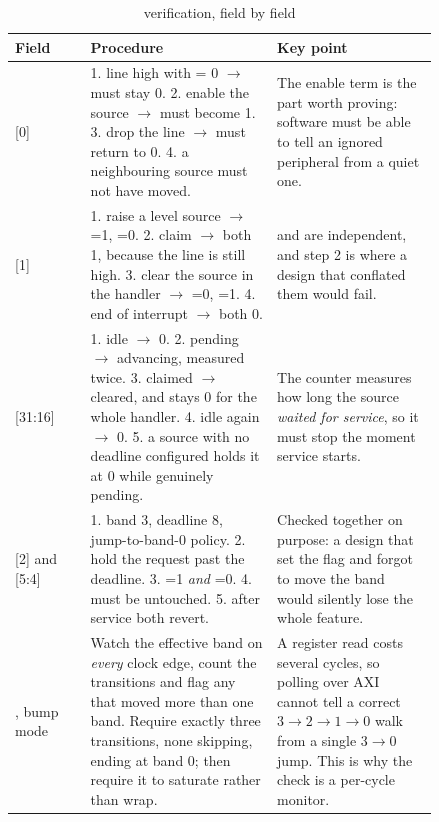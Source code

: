 \begin{table}[H]
\centering
\caption{ verification, field by field}
\label{tab:vpstatus}
\begin{tabular}{@{}L{0.15\linewidth}L{0.37\linewidth}L{0.32\linewidth}@{}}
\toprule
\textbf{Field} & \textbf{Procedure} & \textbf{Key point} \\
\midrule
{} [0] &
  1. line high with  = 0 $\rightarrow$ must stay 0.
  2. enable the source $\rightarrow$ must become 1.
  3. drop the line $\rightarrow$ must return to 0.
  4. a neighbouring source must not have moved. &
  The enable term is the part worth proving: software must be able to tell an
  ignored peripheral from a quiet one. \\
\midrule
{} [1] &
  1. raise a level source $\rightarrow$ =1, =0.
  2. claim $\rightarrow$ both 1, because the line is still high.
  3. clear the source in the handler $\rightarrow$ =0,
     =1.
  4. end of interrupt $\rightarrow$ both 0. &
   and  are independent, and step 2 is where a design that
  conflated them would fail. \\
\midrule
{} [31:16] &
  1. idle $\rightarrow$ 0. 2. pending $\rightarrow$ advancing, measured twice.
  3. claimed $\rightarrow$ cleared, and stays 0 for the whole handler.
  4. idle again $\rightarrow$ 0. 5. a source with no deadline configured holds
  it at 0 while genuinely pending. &
  The counter measures how long the source \emph{waited for service}, so it must
  stop the moment service starts. \\
\midrule
{} [2] and  [5:4] &
  1. band 3, deadline 8, jump-to-band-0 policy. 2. hold the request past the
  deadline. 3. =1 \emph{and} =0. 4. 
  must be untouched. 5. after service both revert. &
  Checked together on purpose: a design that set the flag and forgot to move the
  band would silently lose the whole feature. \\
\midrule
{}, bump mode &
  Watch the effective band on \emph{every} clock edge, count the transitions
  and flag any that moved more than one band. Require exactly three
  transitions, none skipping, ending at band 0; then require it to saturate
  rather than wrap. &
  A register read costs several cycles, so polling over AXI cannot tell a
  correct $3\rightarrow2\rightarrow1\rightarrow0$ walk from a single
  $3\rightarrow0$ jump. This is why the check is a per-cycle monitor. \\

\end{tabular}
\end{table}
